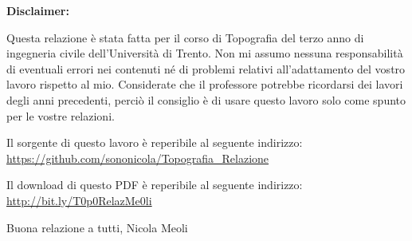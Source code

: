 \pagestyle{plain}

\thispagestyle{empty}

\vspace{2cm}

\doclicenseThis %
\vspace{3cm}
\textbf{{\huge Disclaimer:}}\\
\begin{large}
Questa relazione è stata fatta per il corso di Topografia del terzo anno di ingegneria civile dell'Università di Trento.
Non mi assumo nessuna responsabilità di eventuali errori nei contenuti né di problemi relativi all'adattamento del vostro lavoro rispetto al mio. 
Considerate che il professore potrebbe ricordarsi dei lavori degli anni precedenti, perciò il consiglio è di usare questo lavoro solo come spunto per le vostre relazioni.

\vspace{3cm}
Il sorgente di questo lavoro è reperibile al seguente indirizzo: \\
\url{https://github.com/sononicola/Topografia_Relazione}

\vspace{3cm}
Il download di questo PDF è reperibile al seguente indirizzo:\\
\url{http://bit.ly/T0p0RelazMe0li}
\vspace{3cm}
\begin{flushright}
Buona relazione a tutti,
Nicola Meoli 
\end{flushright}
\end{large}
\newpage